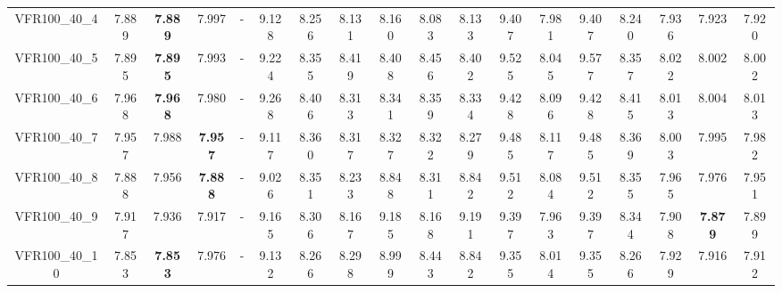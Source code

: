 \begin{tabular}{cc|ccc|ccccccccccccc}
VFR100\_40\_4      & 7.889            & {\bf 7.889}      & 7.997            & -                & 9.128            & 8.256            & 8.131            & 8.160            & 8.083            & 8.133            & 9.407            & 7.981            & 9.407            & 8.240            & 7.936            & 7.923            & 7.920           \\ 
VFR100\_40\_5      & 7.895            & {\bf 7.895}      & 7.993            & -                & 9.224            & 8.355            & 8.419            & 8.408            & 8.456            & 8.402            & 9.525            & 8.045            & 9.577            & 8.357            & 8.022            & 8.002            & 8.002           \\ 
VFR100\_40\_6      & 7.968            & {\bf 7.968}      & 7.980            & -                & 9.268            & 8.406            & 8.313            & 8.341            & 8.359            & 8.334            & 9.428            & 8.096            & 9.428            & 8.415            & 8.013            & 8.004            & 8.013           \\ 
VFR100\_40\_7      & 7.957            & 7.988            & {\bf 7.957}      & -                & 9.117            & 8.360            & 8.317            & 8.327            & 8.322            & 8.279            & 9.485            & 8.117            & 9.485            & 8.369            & 8.003            & 7.995            & 7.982           \\ 
VFR100\_40\_8      & 7.888            & 7.956            & {\bf 7.888}      & -                & 9.026            & 8.351            & 8.233            & 8.848            & 8.311            & 8.842            & 9.512            & 8.084            & 9.512            & 8.355            & 7.965            & 7.976            & 7.951           \\ 
VFR100\_40\_9      & 7.917            & 7.936            & 7.917            & -                & 9.165            & 8.306            & 8.167            & 9.185            & 8.168            & 9.191            & 9.397            & 7.963            & 9.397            & 8.344            & 7.908            & {\bf 7.879}      & 7.899           \\ 
VFR100\_40\_10     & 7.853            & {\bf 7.853}      & 7.976            & -                & 9.132            & 8.266            & 8.298            & 8.999            & 8.443            & 8.842            & 9.355            & 8.014            & 9.355            & 8.266            & 7.929            & 7.916            & 7.912           \\ 

\end{tabular}
